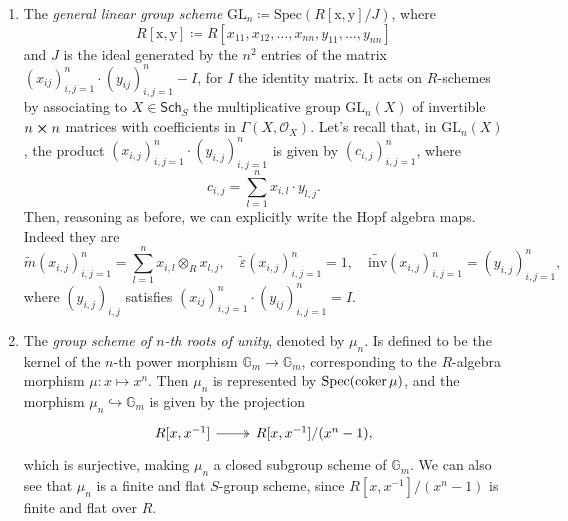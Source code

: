 \documentclass[../Main]{subfiles}
\begin{document}
\begin{ex}
\begin{enumerate}
		\item The {\em general linear group scheme} $\mathrm{GL}_n \coloneqq 
			\mathrm{Spec}(R[\mathrm{x},\mathrm{y}]/J)$,
			where
			\begin{equation*}
				R[\mathrm{x},\mathrm{y}] \coloneqq
				R[x_{11}, x_{12}, \ldots, x_{nn},
				y_{11}, \ldots, y_{nn}]
			\end{equation*} 
			and $J$ is the ideal generated by the $n^2$ entries of the matrix
			$\left( x_{ij} \right)_{i,j=1}^n \cdot \left( y_{ij} \right)_{i,j=1}^n - I$,
			for $I$ the identity matrix.
			It acts on $R$-schemes by associating to
			$X \in \mathsf{Sch}_{ S }$ the multiplicative group
			$\mathrm{GL}_n(X)$ of invertible $n \cross n$
			matrices with coefficients in $\Gamma \left( X , \mathcal{O}_{ X } \right)$.
			Let's recall that, in $\mathrm{GL}_n(X)$, the product
			$\left( x_{i,j} \right)_{i,j = 1}^n \cdot 
			\left( y_{i,j} \right)_{i,j = 1}^n$
			is given by $\left( c_{i,j} \right)_{i,j = 1}^n$, where
			\begin{equation*}
			c_{i,j} = \sum_{l=1}^{n} x_{i,l} \cdot y_{l,j}
			.\end{equation*} 
			Then, reasoning as before, we can explicitly write the Hopf algebra maps.
			Indeed they are
			\begin{equation*}
				\widetilde{m}(x_{i,j})_{i,j=1}^n = \sum_{l=1}^{n} x_{i,l} \otimes_R x_{l,j},
				\quad
				\widetilde{\varepsilon}(x_{i,j})_{i,j=1}^n = 1,
				\quad
				\widetilde{\mathrm{inv}}(x_{i,j})_{i,j=1}^n = (y_{i,j})_{i,j=1}^n
			,\end{equation*} 
			where $\left( y_{i,j} \right)_{i,j}$ satisfies 
			$\left( x_{ij} \right)_{i,j=1}^n \cdot \left( y_{ij} \right)_{i,j=1}^n = I$.


		\item The {\em group scheme of $n$-th roots of unity}, denoted by $\mu_n$.
			Is defined to be the kernel of the $n$-th power morphism
			$\mathbb{G}_m \to \mathbb{G}_m$,
			corresponding to the $R$-algebra morphism
			$\mu\colon x \mapsto x^n$.
			Then $\mu_n$ is represented by $\mathrm{Spec}(\operatorname{coker} \mu)$,
			and the morphism $\mu_n \hookrightarrow \mathbb{G}_m$ is given by the projection
			\begin{equation*}
			\begin{tikzcd}
				R[x,x^{-1}] \arrow[r, "", twoheadrightarrow] &
				R[x,x^{-1}] / (x^n - 1)
			,\end{tikzcd}
			\end{equation*}
			which is surjective, making $\mu_n$
			a closed subgroup scheme of $\mathbb{G}_m$.
			We can also see that 
			$\mu_n$ is a finite and flat $S$-group scheme, 
			since $R[x,x^{-1}] / (x^n-1)$ is finite and flat over $R$.



\end{enumerate}
\end{ex}
\end{document}
